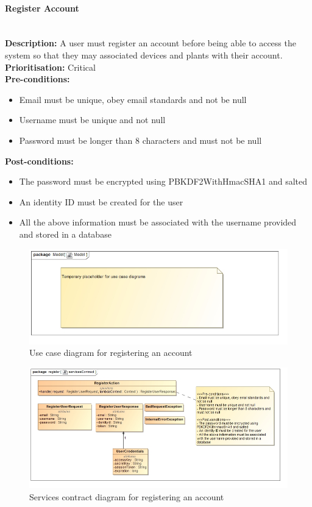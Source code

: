 \documentclass{article}
\begin{document}
	\paragraph{Register Account}\mbox{}\\
		\textbf{Description:} A user must register an account before being able to access the system so that they may associated devices and plants with their account.\\
		\textbf{Prioritisation:} Critical\\		
		\textbf{Pre-conditions:}
			\begin{itemize}
				\item Email must be unique, obey email standards and not be null
				\item Username must be unique and not null
				\item Password must be longer than 8 characters and must not be null
			\end{itemize}
		\textbf{Post-conditions:}
			\begin{itemize}
				\item The password must be encrypted using PBKDF2WithHmacSHA1 and salted
				\item An identity ID must be created for the user
				\item All the above information must be associated with the username provided and stored in a database
			\end{itemize}

		\begin{figure}[H]
			\includegraphics[width=\linewidth]{images/tempUseCase.jpg}
			\caption{Use case diagram for registering an account}
		\end{figure}		
		
		\begin{figure}[H]
			\includegraphics[width=\linewidth]{images/ServicesContracts/register.jpg}
			\caption{Services contract diagram for registering an account}
		\end{figure}
		
\end{document}
